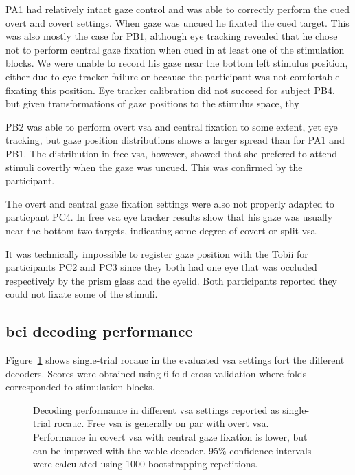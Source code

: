 PA1 had relatively intact gaze control and was able to correctly perform the
cued overt and covert settings.
When gaze was uncued he fixated the cued target.
This was also mostly the case for PB1, although eye tracking revealed that he
chose not to perform central gaze fixation when cued in at least one of the
stimulation blocks. We were unable to record his gaze near the bottom left
stimulus position, either due to eye tracker failure or because the participant
was not comfortable fixating this position.
Eye tracker calibration did not succeed for subject PB4, but given
transformations of gaze positions to the stimulus space, thy

PB2 was able to perform overt \ac{vsa} and central fixation to some extent,
yet eye tracking, but gaze position distributions shows a larger spread than
for PA1 and PB1.
The distribution in free \ac{vsa}, however, showed that she prefered to attend
stimuli covertly when the gaze was uncued.
This was confirmed by the participant.

The overt and central gaze fixation settings were also not properly adapted to
particpant PC4.
In free \ac{vsa} eye tracker results show that his gaze was usually near the
bottom two targets, indicating some degree of covert or split \ac{vsa}.

It was technically impossible to register gaze position with the Tobii
 for participants PC2 and PC3 since they both had one eye that was
occluded respectively by the prism glass and the eyelid.
Both participants reported they could not fixate some of the
stimuli.

\subsection{\Ac{bci} decoding performance}

Figure~\ref{fig:patients/decode} shows single-trial
\ac{rocauc} in the evaluated \ac{vsa} settings fort the different decoders.
Scores were obtained using 6-fold cross-validation where folds corresponded to
stimulation blocks.

\begin{figure}[t]
  
  \caption[%
    Decoding performance in different \ac{vsa} settings.
  ]{%
    Decoding performance in different \ac{vsa} settings reported as
    single-trial \ac{rocauc}.
    Free \ac{vsa} is generally on par with overt \ac{vsa}.
    Performance in covert \ac{vsa} with central gaze fixation is lower, but can
    be improved with the \ac{wcble} decoder.
    95\% confidence intervals were calculated using 1000 bootstrapping
    repetitions.
  }
  \label{fig:patients/decode}
\end{figure}

